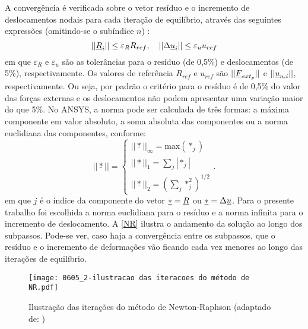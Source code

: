 A convergência é verificada sobre o vetor resíduo e o incremento de deslocamentos nodais para cada iteração de equilíbrio, através das seguintes expressões (omitindo-se o subíndice $n$) \cite[p. 667]{ANSYS2018}:
\begin{equation}
	\label{eq:convergencia}
	||\underline{R}_i|| \leq \varepsilon_R R_{ref},~~~ ||\Delta \underline u_i || \leq \varepsilon_u u_{ref}
\end{equation}
em que $\varepsilon_R$ e $\varepsilon_u$ são as tolerâncias para o resíduo (de 0,5\%) e deslocamentos (de 5\%), respectivamente. Os valores de referência $R_{ref}$ e $u_{ref}$ são $||\underline{F}_{ext_p}||$ e $||\underline u_{n,i}||$, respectivamente. Ou seja, por padrão o critério para o resíduo é de 0,5\% do valor das forças externas e os deslocamentos não podem apresentar uma variação maior do que 5\%. No ANSYS, a norma pode ser calculada de três formas: a máxima componente em valor absoluto, a soma absoluta das componentes ou a norma euclidiana das componentes, conforme:
\begin{equation}
	\label{eq:jacobiano_transformacao}
	||\underline *|| = \left\{
	\begin{array}{lcl}
		||\underline *||_\infty = \text{max}(*_j) \\
		||\underline *||_1 = \sum_{j}|*_j| \\
		||\underline *||_2 = (\sum_{j}*_j^2)^{1/2}
	\end{array}
	\right..
\end{equation}
em que $j$ é o índice da componente do vetor $\underline * = \underline{R}$ ou $\underline * = \Delta \underline u$. Para o presente trabalho foi escolhida a norma euclidiana para o resíduo e a norma infinita para o incremento de deslocamento. A \autoref{NR} ilustra o andamento da solução ao longo dos subpassos. Pode-se ver, caso haja a convergência entre os subpassos, que o resíduo e o incremento de deformações vão ficando cada vez menores ao longo das iterações de equilíbrio.
\begin{figure}[H]
	\begin{center}
		\texttt{[image: 0605\_2-ilustracao das iteracoes do método de NR.pdf]}
	\end{center}
	\caption{\label{NR}Ilustração das iterações do método de Newton-Raphson (adaptado de: )}
\end{figure}

